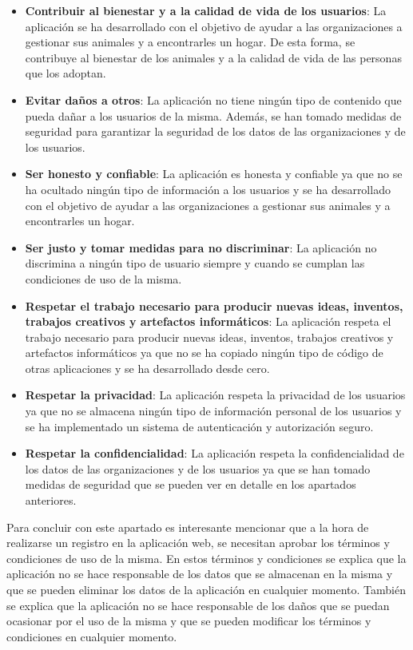 \begin{itemize}
    \item \textbf{Contribuir al bienestar y a la calidad de vida de los usuarios}: La aplicación se ha desarrollado con el
    objetivo de ayudar a las organizaciones a gestionar sus animales y a encontrarles un hogar. De esta forma, se contribuye
    al bienestar de los animales y a la calidad de vida de las personas que los adoptan.
    \item \textbf{Evitar daños a otros}: La aplicación no tiene ningún tipo de contenido que pueda dañar a los usuarios de
    la misma. Además, se han tomado medidas de seguridad para garantizar la seguridad de los datos de las organizaciones y
    de los usuarios.
    \item \textbf{Ser honesto y confiable}: La aplicación es honesta y confiable ya que no se ha ocultado ningún tipo de
    información a los usuarios y se ha desarrollado con el objetivo de ayudar a las organizaciones a gestionar sus animales
    y a encontrarles un hogar.
    \item \textbf{Ser justo y tomar medidas para no discriminar}: La aplicación no discrimina a ningún tipo de usuario
    siempre y cuando se cumplan las condiciones de uso de la misma.
    \item \textbf{Respetar el trabajo necesario para producir nuevas ideas, inventos, trabajos creativos y artefactos informáticos}:
    La aplicación respeta el trabajo necesario para producir nuevas ideas, inventos, trabajos creativos y artefactos informáticos
    ya que no se ha copiado ningún tipo de código de otras aplicaciones y se ha desarrollado desde cero.
    \item \textbf{Respetar la privacidad}: La aplicación respeta la privacidad de los usuarios ya que no se almacena ningún
    tipo de información personal de los usuarios y se ha implementado un sistema de autenticación y autorización seguro.
    \item \textbf{Respetar la confidencialidad}: La aplicación respeta la confidencialidad de los datos de las organizaciones
    y de los usuarios ya que se han tomado medidas de seguridad que se pueden ver en detalle en los apartados anteriores.
\end{itemize}

Para concluir con este apartado es interesante mencionar que a la hora de realizarse un registro en la aplicación web,
se necesitan aprobar los términos y condiciones de uso de la misma. En estos términos y condiciones se explica que la
aplicación no se hace responsable de los datos que se almacenan en la misma y que se pueden eliminar los datos de la
aplicación en cualquier momento. También se explica que la aplicación no se hace responsable de los daños que se puedan
ocasionar por el uso de la misma y que se pueden modificar los términos y condiciones en cualquier momento.

